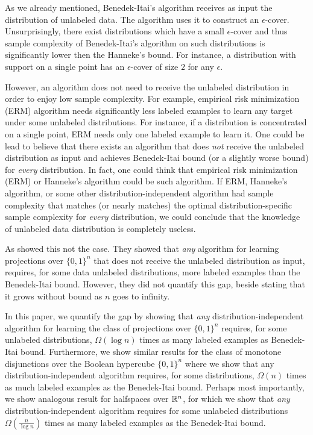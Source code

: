 As we already mentioned, Benedek-Itai's algorithm receives as input the
distribution of unlabeled data. The algorithm uses it to construct an
$\epsilon$-cover. Unsurprisingly, there exist distributions which have a small
$\epsilon$-cover and thus sample complexity of Benedek-Itai's algorithm on such
distributions is significantly lower then the Hanneke's bound. For instance, a
distribution with support on a single point has an $\epsilon$-cover of size $2$
for any $\epsilon$.

However, an algorithm does not need to receive the unlabeled distribution in
order to enjoy low sample complexity. For example, empirical risk minimization
(ERM) algorithm needs significantly less labeled examples to learn any target
under some unlabeled distributions. For instance, if a distribution is
concentrated on a single point, ERM needs only one labeled example to learn it.
One could be lead to believe that there exists an algorithm that does \emph{not}
receive the unlabeled distribution as input and achieves Benedek-Itai bound (or
a slightly worse bound) for \emph{every} distribution. In fact, one could think
that empirical risk minimization (ERM) or Hanneke's algorithm could be such
algorithm. If ERM, Hanneke's algorithm, or some other distribution-independent
algorithm had sample complexity that matches (or nearly matches) the optimal
distribution-specific sample complexity for \emph{every} distribution, we could
conclude that the knowledge of unlabeled data distribution is completely
useless.

As \cite{Darnstadt-Simon-Szorenyi-2013} showed this not the case. They showed
that \emph{any} algorithm for learning projections over $\{0,1\}^n$ that does
not receive the unlabeled distribution as input, requires, for some data
unlabeled distributions, more labeled examples than the Benedek-Itai bound.
However, they did not quantify this gap, beside stating that it grows without
bound as $n$ goes to infinity.

In this paper, we quantify the gap by showing that \emph{any}
distribution-independent algorithm for learning the class of projections over
$\{0,1\}^n$ requires, for some unlabeled distributions, $\Omega(\log n)$ times
as many labeled examples as Benedek-Itai bound. Furthermore, we show similar
results for the class of monotone disjunctions over the Boolean hypercube
$\{0,1\}^n$ where we show that any distribution-independent algorithm requires,
for some distributions, $\Omega(n)$ times as much labeled examples as the
Benedek-Itai bound. Perhaps most importantly, we show analogous result for
halfspaces over $\mathbb{R}^n$, for which we show that \emph{any}
distribution-independent algorithm requires for some unlabeled distributions
$\Omega(\frac{n}{\log n})$ times as many labeled examples as the Benedek-Itai
bound.

